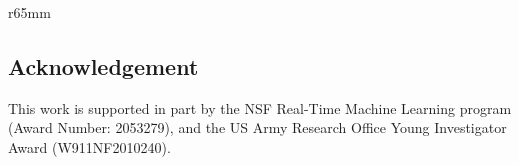 \documentclass{article} \usepackage{iclr2021_conference,times}
\begin{document}
\begin{wrapfigure}{r}{65mm}
\begin{center}
\section*{Acknowledgement}
\vspace{-0.5em}
This work is supported in part by the NSF Real-Time Machine Learning program (Award Number: 2053279), and the US Army Research Office
Young Investigator Award (W911NF2010240).






























































































































\end{center}
\end{wrapfigure}
\end{document}
